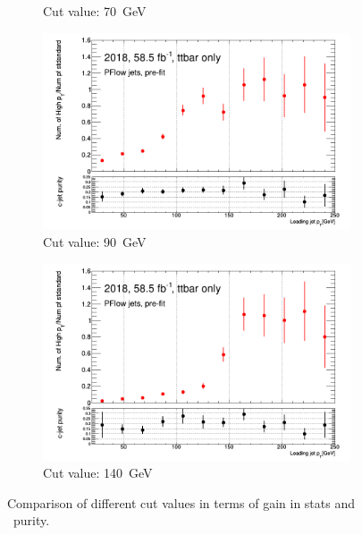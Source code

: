 \begin{figure}[bth]
\begin{subfigure}[t]{.38\linewidth}
\caption{Cut value: 70~GeV}
\end{subfigure}
\begin{subfigure}[t]{.38\linewidth}
\includegraphics[width=1\textwidth]{FTAG_plots/stat_gains/statsgain_90GeV.png}
\caption{Cut value: 90~GeV}
\end{subfigure}
\begin{subfigure}[t]{.38\linewidth}
\centering
\includegraphics[width=1\textwidth]{FTAG_plots/stat_gains/statsgain_140GeV.png}
\caption{Cut value: 140~GeV}
\end{subfigure}

\caption{Comparison of different cut values in terms of gain in stats and \cjet\ purity.}
\label{fig:cutvalue}
\end{figure}

